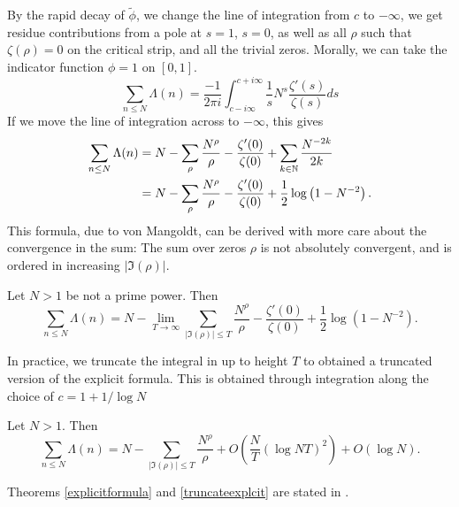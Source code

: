 By the rapid decay of $\tilde\phi$, we change the line of integration from $c$ to $-\infty$, we get residue contributions from
a pole at $s=1$, $s=0$, as well as all $\rho$ such that $\zeta(\rho)=0$ on the critical strip,
and all the trivial zeros. 
Morally, we can take the indicator function $\phi=1$ on $[0,1]$. 
\begin{equation}\label{preexplicit}
    \sum_{n\leq N} \Lambda(n)=
    \frac{-1}{2\pi i}\int_{c-i\infty}^{c+i\infty}
    \frac{1}{s} N^s \frac{\zeta'(s)}{\zeta(s)} ds
\end{equation}
If we move the line of integration across to $-\infty$, this gives \begin{equation}
    \begin{split}
        \sum_{n\leq N} \Lambda(n)&= N - \sum_{\rho} \frac{N^\rho}{\rho} -
        \frac{\zeta'(0)}{\zeta(0)} + \sum_{k\in\mathbb{N}}\frac{N^{-2k}}{2k} \\
        &= N - \sum_{\rho} \frac{N^\rho}{\rho} -
        \frac{\zeta'(0)}{\zeta(0)} + \frac{1}{2}\log\left(1-N^{-2}\right). 
    \end{split}
\end{equation}
This formula, due to von Mangoldt, can be derived with more care about the convergence in the sum:
The sum over zeros $\rho$ is not absolutely convergent, and is ordered in increasing $|\Im(\rho)|$.
\begin{theorem} \label{explicitformula}
    Let $N>1$ be not a prime power. Then\begin{equation}
    \sum_{n\leq N} \Lambda(n) = N - \lim_{T\to \infty}\sum_{|\Im{(\rho)}|\leq T} \frac{N^\rho}{\rho} -
    \frac{\zeta'(0)}{\zeta(0)} + \frac{1}{2}\log\left(1-N^{-2}\right). 
    \end{equation}
\end{theorem}
In practice, we truncate the integral in \label{preexplicit} up to height $T$ to obtained a truncated version of the explicit formula.
This is obtained through integration along the choice of $c=1+1/\log N$
\begin{theorem} \label{truncateexplcit}
    Let $N>1$. Then\begin{equation}
        \sum_{n\leq N} \Lambda(n) = N - \sum_{|\Im{(\rho)}|\leq T} \frac{N^\rho}{\rho} + O(\frac{N}{T}(\log NT) ^2) + O(\log N). 
        \end{equation}
\end{theorem}
Theorems \ref{explicitformula} and \ref{truncateexplcit} are stated in \cite{Goldston2004}.

